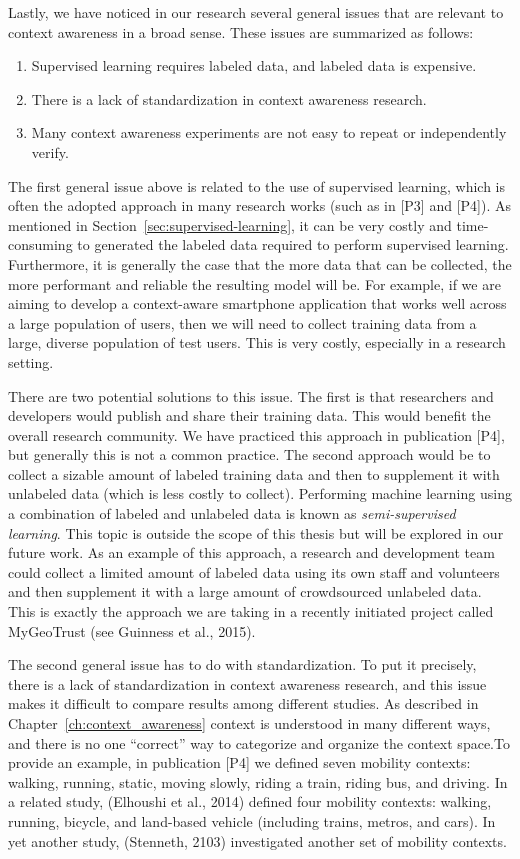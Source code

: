 Lastly, we have noticed in our research several general issues that are relevant to context awareness in a broad sense. These issues are summarized as follows:
%
\begin{enumerate}
 \item Supervised learning requires labeled data, and labeled data is expensive.
 \item There is a lack of standardization in context awareness research.
 \item Many context awareness experiments are not easy to repeat or independently verify.
\end{enumerate}


The first general issue above is related to the use of supervised learning, which is often the adopted approach in many research works (such as in [P3] and [P4]). As mentioned in Section~\ref{sec:supervised-learning}, it can be very costly and time-consuming to generated the labeled data required to perform supervised learning. Furthermore, it is generally the case that the more data that can be collected, the more performant and reliable the resulting model will be. For example, if we are aiming to develop a context-aware smartphone application that works well across a large population of users, then we will need to collect training data from a large, diverse population of test users. This is very costly, especially in a research setting.

There are two potential solutions to this issue. The first is that researchers and developers would publish and share their training data. This would benefit the overall research community. We have practiced this approach in publication [P4], but generally this is not a common practice. The second approach would be to collect a sizable amount of labeled training data and then to supplement it with unlabeled data (which is less costly to collect). Performing machine learning using a combination of labeled and unlabeled data is known as \emph{semi-supervised learning}. This topic is outside the scope of this thesis but will be explored in our future work. As an example of this approach, a research and development team could collect a limited amount of labeled data using its own staff and volunteers and then supplement it with a large amount of crowdsourced unlabeled data. This is exactly the approach we are taking in a recently initiated project called MyGeoTrust (see Guinness et al., 2015).

The second general issue has to do with standardization. To put it precisely, there is a lack of standardization in context awareness research, and this issue makes it difficult to compare results among different studies. As described in Chapter~\ref{ch:context_awareness} context is understood in many different ways, and there is no one ``correct'' way to categorize and organize the context space.To provide an example, in publication [P4] we defined seven mobility contexts: walking, running, static, moving slowly, riding a train, riding bus, and driving. In a related study, (Elhoushi et al., 2014) defined four mobility contexts: walking, running, bicycle, and land-based vehicle (including trains, metros, and cars). In yet another study, (Stenneth, 2103) investigated another set of mobility contexts.

